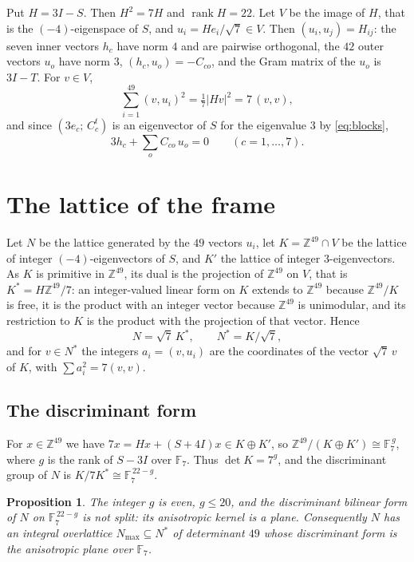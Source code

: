 \documentclass[11pt]{amsart}
\newtheorem{proposition}[theorem]{Proposition}
\theoremstyle{definition}
\theoremstyle{remark}
\newcommand{\Z}{\mathbb{Z}}
\newcommand{\F}{\mathbb{F}}
\newcommand{\rk}{\operatorname{rank}}
\begin{document}
Put $H=3I-S$. Then $H^2=7H$ and $\rk H=22$. Let $V$ be the image of $H$, that is the $(-4)$-eigenspace of $S$, and
$u_i=He_i/\sqrt7\in V$. Then $(u_i,u_j)=H_{ij}$: the seven inner vectors $h_c$ have norm $4$ and are pairwise orthogonal, the
$42$ outer vectors $u_o$ have norm $3$, $(h_c,u_o)=-C_{co}$, and the Gram matrix of the $u_o$ is $3I-T$. For $v\in V$,
\begin{equation}\label{eq:tight}
\textstyle\sum_{i=1}^{49}(v,u_i)^2=\tfrac17|Hv|^2=7\,(v,v) ,
\end{equation}
and since $(3e_c;\,C_c^{t})$ is an eigenvector of $S$ for the eigenvalue $3$ by \eqref{eq:blocks},
\begin{equation}\label{eq:rel}
3h_c+\textstyle\sum_{o}C_{co}\,u_o=0\qquad(c=1,\dots,7) .
\end{equation}

\section{The lattice of the frame}\label{sec:lattice}

Let $N$ be the lattice generated by the $49$ vectors $u_i$, let $K=\Z^{49}\cap V$ be the lattice of integer
$(-4)$-eigenvectors of $S$, and $K'$ the lattice of integer $3$-eigenvectors. As $K$ is primitive in $\Z^{49}$, its dual is the projection of $\Z^{49}$ on $V$, that is $K^*=H\Z^{49}/7$: an
integer-valued linear form on $K$ extends to $\Z^{49}$ because $\Z^{49}/K$ is free, it is the product with an integer
vector because $\Z^{49}$ is unimodular, and its restriction to $K$ is the product with the projection of that vector. Hence
\begin{equation}\label{eq:NK}
N=\sqrt7\,K^*,\qquad N^*=K/\sqrt7 ,
\end{equation}
and for $v\in N^*$ the integers $a_i=(v,u_i)$ are the coordinates of the vector $\sqrt7\,v$ of $K$, with $\sum a_i^2=7(v,v)$.

\subsection{The discriminant form}
For $x\in\Z^{49}$ we have $7x=Hx+(S+4I)x\in K\oplus K'$, so $\Z^{49}/(K\oplus K')\cong\F_7^{\,g}$, where $g$ is the rank of
$S-3I$ over $\F_7$. Thus $\det K=7^g$, and the discriminant group of $N$ is $K/7K^*\cong\F_7^{\,22-g}$.

\begin{proposition}\label{prop:witt}
The integer $g$ is even, $g\le 20$, and the discriminant bilinear form of $N$ on $\F_7^{\,22-g}$ is not split: its anisotropic
kernel is a plane. Consequently $N$ has an integral overlattice $N_{\max}\subseteq N^*$ of determinant $49$ whose discriminant
form is the anisotropic plane over $\F_7$.
\end{proposition}
\end{document}
